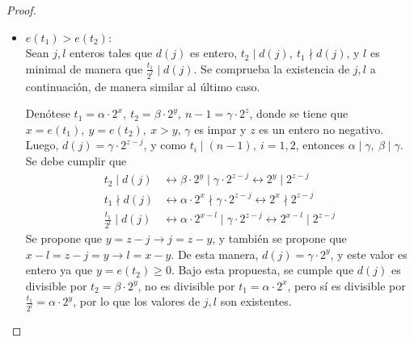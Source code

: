 \documentclass[hidelinks, 12pt]{article}
\newcommand{\Zs}{\mathbb{Z}^*}
\newcommand{\ra}{\rightarrow}
\newcommand{\llra}{\longleftrightarrow}
\begin{document}
\begin{proof}
\begin{itemize}
        Tomando un par $s_1\in\Zs_{q_1},~s_2\in\Zs_{q_2}$ donde $s_i\equiv_{q_i}a_i^{r_i}\equiv_{q_i}a_i^{h_im_i},~i=1,2$, se tiene que como $1\leq r_i\leq\phi(q_i)$, entonces $h_i$ puede tomar los valores
        \[h_i=1,\dots,\frac{\phi(q_i)}{m_i}=t_i\]
        Y como $t_i$ es par, el $h_i$ asociado a $s_i$ puede ser par o impar con la misma frecuencia. Esto implica que las cuatro opciones para la paridad que puede tomar los números $h_1,h_2$ asociados a $s_1,s_2$ (par-par, par-impar, impar-par, impar-impar) ocurre cada una con la misma frecuencia. Como se observó anteriormente, por el lema \ref{le:4.1} se tiene que la cantidad de $b\in\Zs_n$ tales que $b\bmod(q_1,q_2)=(s_1,s_2)$ es la misma para todos los posibles pares $s_1\in\Zs_{q_1},~s_2\in\Zs_{q_2}$, y esto a su vez conlleva que, para los $s_i$ vinculados a exponentes $r_i=h_im_i$, la cantidad de $b\in\Zs_n$ asociados a cada par $r_1,r_2$ es la misma. Como para la mitad de estos pares $r_1,r_2$ se tiene que un $h_i$ es par mientras que el otro es impar, entonces para la mitad de los $b\in\Zs_n$ asociados a estos exponentes se puede asegurar que satisfacen $W_n(b)$.

        Se estableció anteriormente que la cantidad de $b\in\Zs_n$ asociados a $r_i$ múltiplos de $m_i$ es $\frac{\phi(n)}{m_1m_2}$, y como la mitad de estos satisfacen la condición $(ii)(b)$, se concluye que de $\frac{\phi(n)}{2m_1m_2}$ de los $b\in\Zs_n$ no se puede afirmar que $W_n(b)$ sea verdadero, y por lo tanto a lo más $\frac{\phi(n)}{2m_1m_2}$ de los $b\in\Zs_n$ no satisfacen $W_n(b)$.

        \item $e(t_1)>e(t_2)$: \\
        Sean $j,l$ enteros tales que $d(j)$ es entero, $t_2\mid d(j),~t_1\nmid d(j)$, y $l$ es minimal de manera que $\frac{t_1}{2^l}\mid d(j)$. Se comprueba la existencia de $j,l$ a continuación, de manera similar al último caso.
        
        Denótese $t_1=\alpha\cdot 2^x,~t_2=\beta\cdot 2^y,~n-1=\gamma\cdot 2^z$, donde se tiene que $x=e(t_1),~y=e(t_2),~x>y$, $\gamma$ es impar y $z$ es un entero no negativo. Luego, $d(j)=\gamma\cdot 2^{z-j}$, y como $t_i\mid(n-1),~i=1,2$, entonces $\alpha\mid\gamma,~\beta\mid\gamma$. Se debe cumplir que
        \begin{align*}
            t_2\mid d(j)&\llra\beta\cdot 2^y\mid\gamma\cdot 2^{z-j}\llra 2^y\mid 2^{z-j} \\
            t_1\nmid d(j)&\llra\alpha\cdot 2^x\nmid\gamma\cdot 2^{z-j}\llra 2^x\nmid 2^{z-j} \\
            \frac{t_1}{2^l}\mid d(j)&\llra\alpha\cdot 2^{x-l}\mid\gamma\cdot 2^{z-j}\llra 2^{x-l}\mid 2^{z-j}
        \end{align*}
        Se propone que $y=z-j\ra j=z-y$, y también se propone que $x-l=z-j=y\ra l=x-y$. De esta manera, $d(j)=\gamma\cdot 2^y$, y este valor es entero ya que $y=e(t_2)\geq 0$. Bajo esta propuesta, se cumple que $d(j)$ es divisible por $t_2=\beta\cdot 2^y$, no es divisible por $t_1=\alpha\cdot 2^x$, pero sí es divisible por $\frac{t_1}{2^l}=\alpha\cdot 2^y$, por lo que los valores de $j,l$ son existentes.


\end{itemize}
\end{proof}
\end{document}
